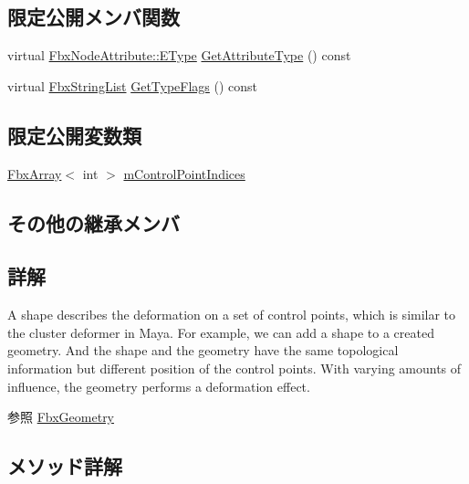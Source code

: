 \subsection*{限定公開メンバ関数}
\begin{DoxyCompactItemize}
\item 
virtual \hyperlink{class_fbx_node_attribute_a08e1669d3d1a696910756ab17de56d6a}{Fbx\+Node\+Attribute\+::\+E\+Type} \hyperlink{class_fbx_shape_a976141cda408244bd89c44c7a6b22d4b}{Get\+Attribute\+Type} () const
\item 
virtual \hyperlink{class_fbx_string_list}{Fbx\+String\+List} \hyperlink{class_fbx_shape_a36129584616ab648435077244d6e6dbf}{Get\+Type\+Flags} () const
\end{DoxyCompactItemize}
\subsection*{限定公開変数類}
\begin{DoxyCompactItemize}
\item 
\hyperlink{class_fbx_array}{Fbx\+Array}$<$ int $>$ \hyperlink{class_fbx_shape_ae27b2ace894858d90213f44ebe3f23a1}{m\+Control\+Point\+Indices}
\end{DoxyCompactItemize}
\subsection*{その他の継承メンバ}


\subsection{詳解}
A shape describes the deformation on a set of control points, which is similar to the cluster deformer in Maya. For example, we can add a shape to a created geometry. And the shape and the geometry have the same topological information but different position of the control points. With varying amounts of influence, the geometry performs a deformation effect.

\begin{DoxySeeAlso}{参照}
\hyperlink{class_fbx_geometry}{Fbx\+Geometry} 
\end{DoxySeeAlso}


\subsection{メソッド詳解}
\mbox{\label{class_fbx_shape_ac64fb6d8fc185a698a7c982805538e47}} 
